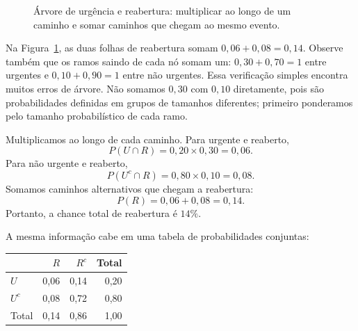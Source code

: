 \begin{figure}[htbp]
\centering
{}
\caption{Árvore de urgência e reabertura: multiplicar ao longo de um caminho e somar caminhos que chegam ao mesmo evento.}
\label{fig:arvore-urgencia}
\end{figure}

Na Figura~\ref{fig:arvore-urgencia}, as duas folhas de reabertura somam $0{,}06+0{,}08=0{,}14$. Observe também que os ramos saindo de cada nó somam um: $0{,}30+0{,}70=1$ entre urgentes e $0{,}10+0{,}90=1$ entre não urgentes. Essa verificação simples encontra muitos erros de árvore. Não somamos $0{,}30$ com $0{,}10$ diretamente, pois são probabilidades definidas em grupos de tamanhos diferentes; primeiro ponderamos pelo tamanho probabilístico de cada ramo.

Multiplicamos ao longo de cada caminho. Para urgente e reaberto,
\[
P(U\cap R)=0{,}20\times0{,}30=0{,}06.
\]
Para não urgente e reaberto,
\[
P(U^c\cap R)=0{,}80\times0{,}10=0{,}08.
\]
Somamos caminhos alternativos que chegam a reabertura:
\[
P(R)=0{,}06+0{,}08=0{,}14.
\]
Portanto, a chance total de reabertura é $14\%$.

A mesma informação cabe em uma tabela de probabilidades conjuntas:

\begin{center}
\small
\begin{tabular}{@{}lrrr@{}}
\toprule
 & $R$ & $R^c$ & Total \\
\midrule
$U$ & 0,06 & 0,14 & 0,20 \\
$U^c$ & 0,08 & 0,72 & 0,80 \\
\midrule
Total & 0,14 & 0,86 & 1,00 \\
\bottomrule
\end{tabular}
\end{center}

